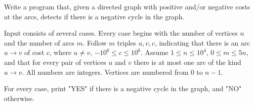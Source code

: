 

\Statement

Write a program that,
given a directed graph with positive and/or negative costs at the arcs,
detects if there is a negative cycle in the graph.


\Input

Input consists of several cases.
Every case begins with the number of vertices $n$
and the number of arcs $m$.
Follow $m$ triples $u, v, c$,
indicating that there is an arc $u \to v$ of cost $c$,
where $u \ne v$, $-10^6 \le c \le 10^6$.
Assume $1 \le n \le 10^4$,
$0 \le m \le 5n$,
and that for every pair of vertices $u$ and $v$
there is at most one arc of the kind $u \to v$.
All numbers are integers.
Vertices are numbered from 0 to $n-1$.

\Output

For every case, print "YES" if there is a negative cycle in the graph, and "NO" otherwise.

\Sample
